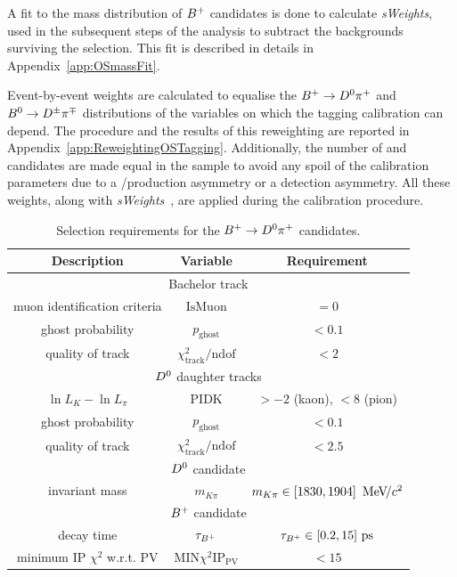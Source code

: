 A fit to the mass distribution of $B^+$ candidates is done to calculate \emph{sWeights},
used in the subsequent steps of the analysis to subtract the backgrounds surviving the selection.
This fit is described in details in Appendix~\ref{app:OSmassFit}.

Event-by-event weights are calculated to equalise the $B^+\rightarrow D^0\pi^+$ and $B^0\rightarrow D^\pm\pi^\mp$ distributions of the variables on which
the tagging calibration can depend. The procedure and the results of this reweighting are reported in
Appendix~\ref{app:ReweightingOSTagging}. Additionally, the number of \Bp and \Bm candidates are made equal in the sample to avoid any spoil of the calibration
parameters due to a \Bp/\Bm production asymmetry or a detection asymmetry.
All these weights, along with \emph{sWeights}~\cite{Pivk:2004ty}, are applied during
the calibration procedure.

\begin{table}[htbp]
	\centering
	\caption{Selection requirements for the $B^+\rightarrow D^0\pi^+$ candidates.}
	\begin{tabular}{ccc}
		\toprule
		Description & Variable & Requirement \\
		\midrule
		\multicolumn{3}{c}{Bachelor track } \\
		\midrule
		muon identification criteria & $\text{IsMuon}$ & $=0$ \\
		ghost probability & $p_\text{ghost}$ & $<0.1$ \\
		quality of track & $\chi^2_\text{track}/\text{ndof}$ & $<2$ \\
		\midrule
		\multicolumn{3}{c}{$D^0$ daughter tracks} \\
		\midrule
		$\ln L_K - \ln L_\pi$ & $\text{PIDK}$ & $>-2$ (kaon), $<8$ (pion) \\
		ghost probability & $p_\text{ghost}$ & $<0.1$ \\
		quality of track & $\chi^2_\text{track}/\text{ndof}$ & $<2.5$ \\
		\midrule
		\multicolumn{3}{c}{$D^0$ candidate} \\
		\midrule
		invariant mass & $m_{K\pi}$ & $m_{K\pi}\in [1830,1904]~{\mathrm{\,Me\kern -0.1em V\!/}c^2}$ \\	
		\midrule
                \multicolumn{3}{c}{$B^+$ candidate} \\
		\midrule
		decay time & $\tau_{B^+}$ & $\tau_{B^+}\in [0.2,15]~\rm ps$ \\
		minimum IP $\chi^2$ w.r.t. PV & $\text{MIN}\chi^2\text{IP}_\text{PV}$ & $<15$ \\
		\bottomrule
	\end{tabular}
	\label{tab:OSSelection}
\end{table}

